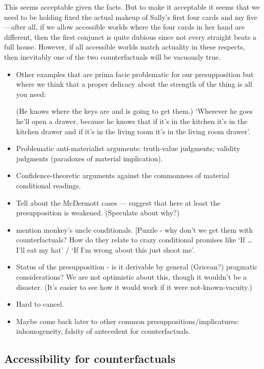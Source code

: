 This seems acceptable given the facts. But to make it acceptable it
seems that we need to be holding fixed the actual makeup of Sally's
first four cards and my five---after all, if we allow accessible worlds
where the four cards in her hand are different, then the first conjunct
is quite dubious since not every straight beats a full house. However,
if all accessible worlds match actuality in these respects, then
inevitably one of the two counterfactuals will be vacuously true.

\begin{itemize}
\item
  Other examples that are prima facie problematic for our presupposition
  but where we think that a proper delicacy about the strength of the
  thing is all you need:

  (He knows where the keys are and is going to get them.) `Wherever he
  goes he'll open a drawer, because he knows that if it's in the kitchen
  it's in the kitchen drawer and if it's in the living room it's in the
  living room drawer'.
\item
  Problematic anti-materialist arguments: truth-value judgments;
  validity judgments (paradoxes of material implication).
\item
  Confidence-theoretic arguments against the commonness of material
  conditional readings.
\item
  Tell about the McDermott cases --- suggest that here at least the
  presupposition is weakened. (Speculate about why?)
\item
  mention monkey's uncle conditionals. {[}Puzzle - why don't we get them
  with counterfactuals? How do they relate to crazy conditional promises
  like `If \ldots{} I'll eat my hat' / `If I'm wrong about this just
  shoot me'.
\item
  Status of the presupposition - is it derivable by general (Gricean?)
  pragmatic considerations? We are not optimistic about this, though it
  wouldn't be a disaster. (It's easier to see how it would work if it
  were not-known-vacuity.)
\item
  Hard to cancel.
\item
  Maybe come back later to other common presuppositions/implicatures:
  inhomogeneity, falsity of antecedent for counterfactuals.
\end{itemize}

\subsection{Accessibility for
counterfactuals}\label{accessibility-for-counterfactuals}

